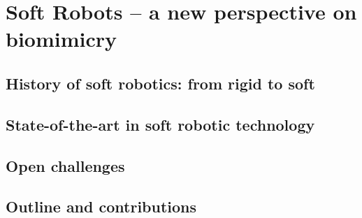 \chapter[Soft Robots -- a new perspective]{Soft Robots -- a new perspective on biomimicry}
\label{chap: chapter 1}
\vspace*{-5mm}

\section{History of soft robotics: from rigid to soft} \label{sec: chap1 0_history}
%

\section{State-of-the-art in soft robotic technology} \label{sec: chap1 0_SOT}


\section{Open challenges}


\section{Outline and contributions}
%
%
%
%


